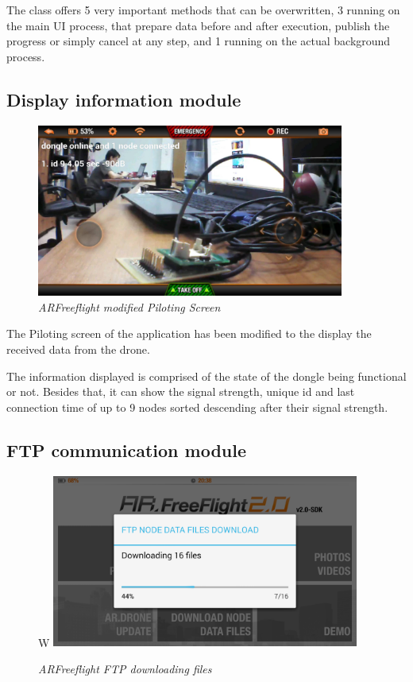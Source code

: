 The class offers 5 very important methods that can be overwritten, 3 running on the main UI process, that prepare data before and after execution, publish the progress or simply cancel at any step, and 1 running on the actual background process.


\subsection{Display information module}

\begin{figure}[ht]
\begin{center}
\includegraphics[width=0.9\textwidth]{img/android_info.png}
\end{center}
\caption{\small \itshape{ARFreeflight modified Piloting Screen}}
\end{figure}

The Piloting screen of the application has been modified to the display the received data from the drone.

The information displayed is comprised of the state of the dongle being functional or not. Besides that, it can show the signal strength, unique id and last connection time of up to 9 nodes sorted descending after their signal strength.

\subsection{FTP communication module}

\begin{figure}[ht]
\begin{center}W
\includegraphics[width=0.9\textwidth]{img/android_ftp.png}
\end{center}
\caption{\small \itshape{ARFreeflight FTP downloading files}}
\end{figure}

